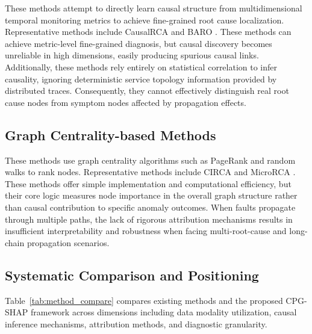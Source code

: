 \documentclass[conference]{IEEEtran}
\begin{document}
These methods attempt to directly learn causal structure from multidimensional temporal monitoring metrics to achieve fine-grained root cause localization. Representative methods include CausalRCA \cite{causalrca} and BARO \cite{baro2023}. These methods can achieve metric-level fine-grained diagnosis, but causal discovery becomes unreliable in high dimensions, easily producing spurious causal links. Additionally, these methods rely entirely on statistical correlation to infer causality, ignoring deterministic service topology information provided by distributed traces. Consequently, they cannot effectively distinguish real root cause nodes from symptom nodes affected by propagation effects.

\subsection{Graph Centrality-based Methods}

These methods use graph centrality algorithms such as PageRank and random walks to rank nodes. Representative methods include CIRCA \cite{circa} and MicroRCA \cite{microrca}. These methods offer simple implementation and computational efficiency, but their core logic measures node importance in the overall graph structure rather than causal contribution to specific anomaly outcomes. When faults propagate through multiple paths, the lack of rigorous attribution mechanisms results in insufficient interpretability and robustness when facing multi-root-cause and long-chain propagation scenarios.

\subsection{Systematic Comparison and Positioning}

Table~\ref{tab:method_compare} compares existing methods and the proposed CPG-SHAP framework across dimensions including data modality utilization, causal inference mechanisms, attribution methods, and diagnostic granularity.
\end{document}
